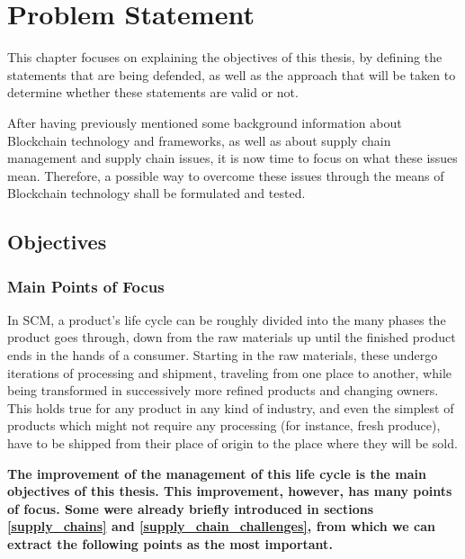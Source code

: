 \chapter{Problem Statement}
\label{chap:supply-chain-problems}
\minitoc \mtcskip \noindent 

This chapter focuses on explaining the objectives of this thesis, by defining the statements that are being defended, as well as the approach that will be taken to determine whether these statements are valid or not.

After having previously mentioned some background information about Blockchain technology and frameworks, as well as about supply chain management and supply chain issues, it is now time to focus on what these issues mean. Therefore, a possible way to overcome these issues through the means of Blockchain technology shall be formulated and tested.

\section{Objectives}

\subsection{Main Points of Focus}
\label{sec:points-of-focus}
In SCM, a product's life cycle can be roughly divided into the many phases the product goes through, down from the raw materials up until the finished product ends in the hands of a consumer. Starting in the raw materials, these undergo iterations of processing and shipment, traveling from one place to another, while being transformed in successively more refined products  and changing owners. This holds true for any product in any kind of industry, and even the simplest of products which might not require any processing (for instance, fresh produce), have to be shipped from their place of origin to the place where they will be sold.



\textbf{The improvement of the management of this life cycle is the main objectives of this thesis. This improvement, however, has many points of focus. Some were already briefly introduced in sections \ref{supply_chains} and \ref{supply_chain_challenges}, from which we can extract the following points as the most important.}

